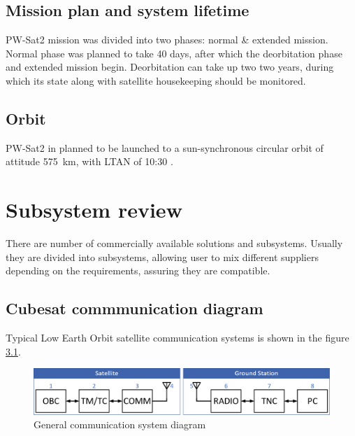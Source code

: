     \section{Mission plan and system lifetime}
        PW-Sat2 mission was divided into two phases: normal \& extended mission. Normal phase was planned to take 40 days, after which the deorbitation phase and extended mission begin. Deorbitation can  take up two two years, during which its state along with satellite housekeeping should be monitored.

    \section{Orbit}
        PW-Sat2 in planned to be launched to a sun-synchronous circular orbit of attitude \SI{575}{\kilo\meter}, with LTAN of 10:30 \cite{PWSAT_MA_CDR}.

\chapter{Subsystem review}
There are number of commercially available solutions and subsystems. Usually they are divided into subsystems, allowing user to mix different suppliers depending on the requirements, assuring they are compatible.

\section{Cubesat commmunication diagram}
Typical Low Earth Orbit satellite communication systems is shown in the figure \ref{comm_diagram}.

\begin{figure}[H]
    \centering
    \includegraphics[width=0.7\paperwidth]{img/1/comm_diagram.eps}
    \caption{General communication system diagram}
    \label{comm_diagram}
\end{figure}

